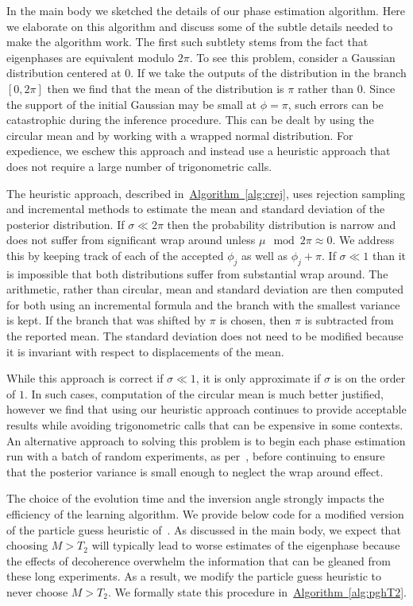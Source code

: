 \documentclass[aps,pra,amsmath,twocolumn,amssymb,superscriptaddress]{revtex4-1}
\newcommand{\alg}[1]{\hyperref[alg:#1]{Algorithm~\ref*{alg:#1}}}
\begin{document}
In the main body we sketched the details of our phase estimation algorithm.  Here we elaborate on this algorithm and discuss some of the
subtle details needed to make the algorithm work.  The first such subtlety stems from the fact that eigenphases are equivalent modulo $2\pi$.  
To see this problem, consider a Gaussian distribution centered at $0$.  If we take the outputs of the distribution in the branch $[0,2\pi]$ then we find that the mean of the distribution is $\pi$ rather than $0$.  Since the support of the initial Gaussian may be small at $\phi=\pi$, such errors can be catastrophic during the inference procedure.  This can be dealt by using the circular mean and by working with a wrapped normal distribution.  For expedience, we eschew this approach and instead use a heuristic approach that does  not require a large number of trigonometric calls.

The heuristic approach, described in~\alg{crej}, uses rejection sampling and incremental methods to estimate the mean and standard deviation of the posterior distribution.  If $\sigma\ll 2\pi$ then the probability distribution is narrow and does not suffer from significant wrap around unless $\mu \mod 2\pi \approx 0$.  We address this by keeping track of each of the accepted $\phi_j$ as well as $\phi_j+\pi$.  If $\sigma\ll 1$ than it is impossible that both distributions suffer from substantial wrap around.  The arithmetic, rather than circular, mean and standard deviation are then computed for both using an incremental formula and the branch with the smallest variance is kept.  If the branch that was shifted by $\pi$ is chosen, then $\pi$ is subtracted from the reported mean.  The standard deviation does not need to be modified because it is invariant with respect to displacements of the mean.

While this approach is correct if $\sigma\ll 1$, it is only approximate if $\sigma$ is on the order of $1$.  In such cases, computation of the circular mean is much better justified, however we find that using our heuristic approach continues to provide acceptable results while avoiding trigonometric calls that can be expensive in some contexts.  An alternative approach to solving this problem is to begin each phase estimation run with a batch of random experiments, as per~\cite{SHF14}, before continuing to ensure that the posterior variance is small enough to neglect the wrap around effect.

The choice of the evolution time and the inversion angle strongly impacts the efficiency of the learning algorithm.  We provide below code for a modified version of the
particle guess heuristic of~\cite{wiebe_hamiltonian_2014}.  As discussed in the main body, we expect that choosing $M> T_2$ will typically lead to worse estimates of the eigenphase because the effects of decoherence overwhelm the information that can be gleaned from these long experiments.  As a result, we modify the particle guess heuristic  to never choose $M> T_2$.  We formally state this procedure in~\alg{pghT2}.
\end{document}
